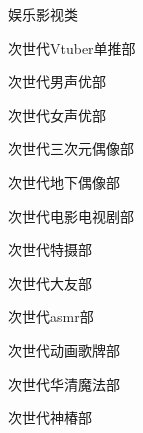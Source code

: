\begin{multicols}{3}
    \begin{categorysection}{娱乐影视类}
        \item 次世代Vtuber单推部
        \item 次世代男声优部
        \item 次世代女声优部
        \item 次世代三次元偶像部
        \item 次世代地下偶像部
        \item 次世代电影电视剧部
        \item 次世代特摄部
        \item 次世代大友部
        \item 次世代asmr部
        \item 次世代动画歌牌部
        \item 次世代华清魔法部
        \item 次世代神椿部
    \end{categorysection}


\end{multicols}
